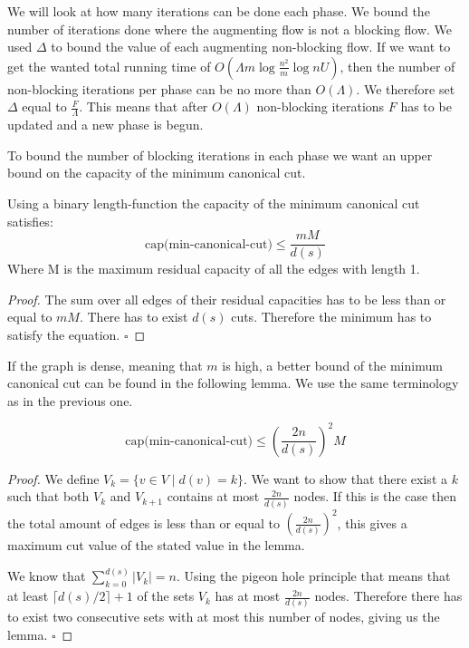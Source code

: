 We will look at how many iterations can be done each phase. We bound the number of iterations done where the augmenting flow is not a blocking flow. 
We used $\Delta$ to bound the value of each augmenting non-blocking flow.
If we want to get the wanted total running time of $O\left(\Lambda m\log{\frac{n^2}{m}}\log{nU}\right)$, then the number of non-blocking iterations
per phase can be no more than $O(\Lambda)$.
We therefore set $\Delta$ equal to $\frac{F}{\Lambda}$. This means that after $O(\Lambda)$ non-blocking iterations $F$ has to be updated and a new phase
is begun.

To bound the number of blocking iterations in each phase we want an upper bound on the capacity of the minimum canonical cut.

\begin{lemma} \label{GR-MinCut-m}
	Using a binary length-function the capacity of the minimum canonical cut satisfies: 
	$$\text{cap(min-canonical-cut)} \leq \frac{mM}{d(s)}$$
	Where M is the maximum residual capacity of all the edges with length 1.
\end{lemma}
\begin{proof}
	The sum over all edges of their residual capacities has to be less than or equal to $mM$. There has to exist $d(s)$ cuts.
	Therefore the minimum has to satisfy the equation. $\square$
\end{proof}
If the graph is dense, meaning that $m$ is high, a better bound of the minimum canonical cut can be found in the following lemma. We use the same
terminology as in the previous one.
\begin{lemma}\label{GR-MinCut-n}
	$$\text{cap(min-canonical-cut)} \leq \left(\frac{2n}{d(s)}\right)^2 M$$
\end{lemma}
\begin{proof}
	We define $V_k = \{v \in V \mid d(v) = k\}$. We want to show that there exist a $k$ such that both $V_k$ and $V_{k+1}$ contains at most
	$\frac{2n}{d(s)}$ nodes. If this is the case then the total amount of edges is less than or equal to $\left(\frac{2n}{d(s)}\right)^2$, this gives
	a maximum cut value of the stated value in the lemma.
	
	We know that $\sum_{k = 0}^{d(s)}{|V_k|} = n$. Using the pigeon hole principle that means that at least $\lceil d(s)/2\rceil + 1$ of the sets $V_k$ has
	at most $\frac{2n}{d(s)}$ nodes. Therefore there has to exist two consecutive sets with at most this number of nodes, giving us the lemma. $\square$
\end{proof}

